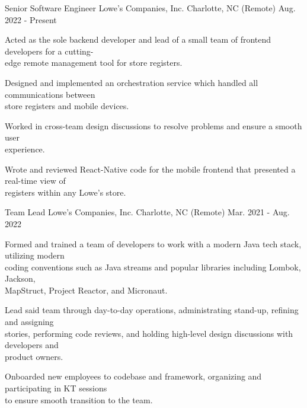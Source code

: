 

\begin{cventries}

  \cventry
    {Senior Software Engineer}
    {Lowe's Companies, Inc.}
    {Charlotte, NC (Remote)}
    {Aug. 2022 - Present}
    {
        \begin{cvitems}
            \item {Acted as the sole backend developer and lead of a small team of frontend developers for a cutting-\\edge remote management tool for store registers.}
            \item {Designed and implemented an orchestration service which handled all communications between \\store registers and mobile devices.}
            \item {Worked in cross-team design discussions to resolve problems and ensure a smooth user \\experience.}
            \item {Wrote and reviewed React-Native code for the mobile frontend that presented a real-time view of \\registers within any Lowe's store.}
        \end{cvitems}
    }

  \cventry
    {Team Lead}
    {Lowe's Companies, Inc.}
    {Charlotte, NC (Remote)}
    {Mar. 2021 - Aug. 2022}
    {
        \begin{cvitems}
            \item {Formed and trained a team of developers to work with a modern Java tech stack, utilizing modern \\coding conventions such as Java streams and popular libraries including Lombok, Jackson, \\MapStruct, Project Reactor, and Micronaut.}
            \item {Lead said team through day-to-day operations, administrating stand-up, refining and assigning \\stories, performing code reviews, and holding high-level design discussions with developers and \\product  owners.}
            \item {Onboarded new employees to codebase and framework, organizing and participating in KT sessions \\to ensure smooth transition to the team.}
        \end{cvitems}
    }
    

\end{cventries}
